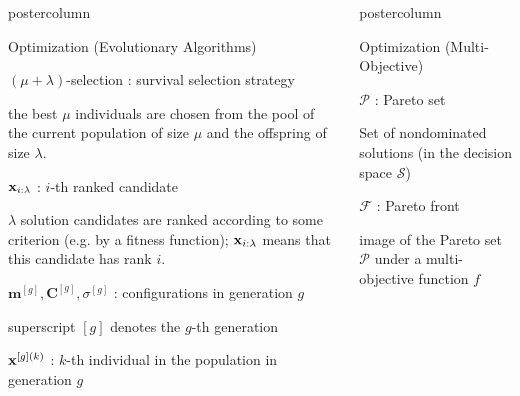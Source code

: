 \documentclass[11pt,compress,t,notes=noshow, xcolor=table]{beamer}
\newlength{\columnheight} %
\begin{document}
\begin{frame}[fragile]{}
\begin{columns}
\begin{column}{.31\textwidth}
\begin{beamercolorbox}[center]{postercolumn}
\begin{minipage}{.98\textwidth}
{\begin{myblock}{Optimization (Evolutionary Algorithms)}
						\begin{codebox}
							 $(\mu + \lambda)$-selection : survival selection strategy
						\end{codebox}
						\hspace*{1ex} the best $\mu$ individuals are chosen from the pool of the current population of size $\mu$ and the offspring of size $\lambda$. \\
						\begin{codebox}
							 $\mathbf{x}_{i:\lambda}$ : $i$-th ranked candidate
						\end{codebox}
						\hspace*{1ex} $\lambda$ solution candidates are ranked according to some criterion (e.g. by a fitness function); $\mathbf{x}_{i:\lambda}$ means that this candidate has rank $i$. \\
						\begin{codebox}
							 $\bm{m}^{[g]}, \bm{C}^{[g]}, \sigma^{[g]}$ : configurations in generation $g$
						\end{codebox}
						\hspace*{1ex} superscript $[g]$ denotes the $g$-th generation \\
						\begin{codebox}
							 $\mathbf{x}^{[g](k)}$ : $k$-th individual in the population in generation $g$
						\end{codebox}
						\end{myblock}
				}
			\end{minipage}
		\end{beamercolorbox}
	\end{column}
    \begin{column}{.31\textwidth}
	       	\begin{beamercolorbox}[center]{postercolumn}
			     \begin{minipage}{.98\textwidth}
				    \parbox[t][\columnheight]{\textwidth}{
                        \begin{myblock}{Optimization (Multi-Objective)}
    						\begin{codebox}
    						      $\mathcal{P}$ : Pareto set
    						\end{codebox}
    						\hspace*{1ex} Set of nondominated solutions (in the decision space $\mathcal{S}$) \\
    						\begin{codebox}
    						      $\mathcal{F}$ : Pareto front
    						\end{codebox}
    						\hspace*{1ex} image of the Pareto set $\mathcal{P}$ under a multi-objective function $f$ \\
                        \end{myblock}
                    }
			\end{minipage}
		\end{beamercolorbox}
	\end{column}
\end{columns}
\end{frame}
\end{document}
